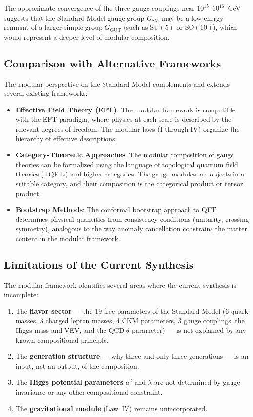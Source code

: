 \documentclass[12pt]{article}
\theoremstyle{definition}
\theoremstyle{remark}
\newcommand{\su}[1]{\mathrm{SU}(#1)}
\begin{document}
The approximate convergence of the three gauge couplings near $10^{15}$--$10^{16}$~GeV suggests that the Standard Model gauge group $G_{\mathrm{SM}}$ may be a low-energy remnant of a larger simple group $G_{\mathrm{GUT}}$ (such as $\su{5}$ or $\mathrm{SO}(10)$), which would represent a deeper level of modular composition.

\subsection{Comparison with Alternative Frameworks}

The modular perspective on the Standard Model complements and extends several existing frameworks:
\begin{itemize}
\item \textbf{Effective Field Theory (EFT)}: The modular framework is compatible with the EFT paradigm, where physics at each scale is described by the relevant degrees of freedom. The modular laws (I through IV) organize the hierarchy of effective descriptions.
\item \textbf{Category-Theoretic Approaches}: The modular composition of gauge theories can be formalized using the language of topological quantum field theories (TQFTs) and higher categories. The gauge modules are objects in a suitable category, and their composition is the categorical product or tensor product.
\item \textbf{Bootstrap Methods}: The conformal bootstrap approach to QFT determines physical quantities from consistency conditions (unitarity, crossing symmetry), analogous to the way anomaly cancellation constrains the matter content in the modular framework.
\end{itemize}

\subsection{Limitations of the Current Synthesis}

The modular framework identifies several areas where the current synthesis is incomplete:
\begin{enumerate}
\item The \textbf{flavor sector} --- the 19 free parameters of the Standard Model (6 quark masses, 3 charged lepton masses, 4 CKM parameters, 3 gauge couplings, the Higgs mass and VEV, and the QCD $\theta$ parameter) --- is not explained by any known compositional principle.
\item The \textbf{generation structure} --- why three and only three generations --- is an input, not an output, of the composition.
\item The \textbf{Higgs potential parameters} $\mu^2$ and $\lambda$ are not determined by gauge invariance or any other compositional constraint.
\item The \textbf{gravitational module} (Law~IV) remains unincorporated.
\end{enumerate}
\end{document}
